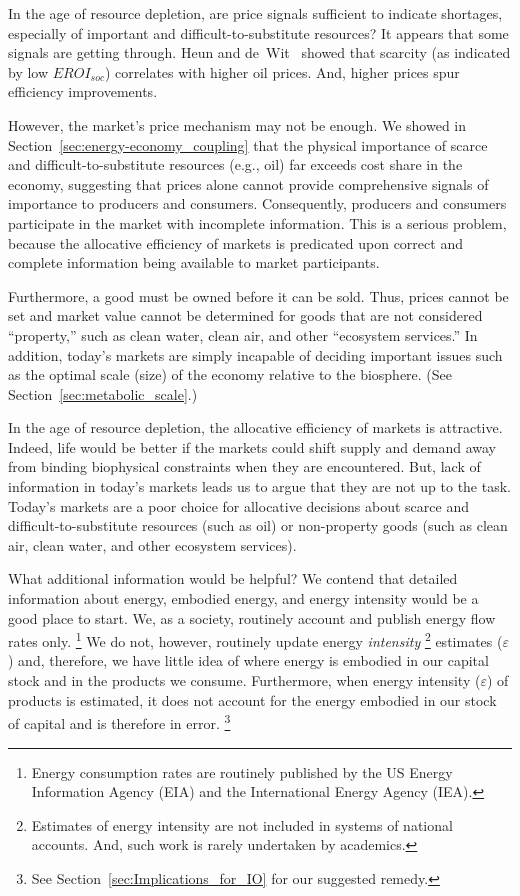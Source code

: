 In the age of resource depletion, 
are price signals sufficient to indicate shortages, 
especially of important and difficult-to-substitute resources?
It appears that some signals are getting through.
Heun and de~Wit~\cite{Heun:2012ek}
showed that scarcity (as indicated by low $EROI_{soc}$)
correlates with higher oil prices.
And, higher prices spur efficiency improvements.\cite{Vlasic:2013aa}

However, the market's price mechanism may not be enough.
We showed in Section~\ref{sec:energy-economy_coupling}
that the physical importance 
of scarce and difficult-to-substitute resources (e.g., oil) 
far exceeds cost share in the economy,
suggesting that prices alone cannot provide comprehensive
signals of importance to producers and consumers.
Consequently, producers and consumers participate 
in the market with incomplete information.
This is a serious problem, 
because the allocative efficiency of markets 
is predicated upon
correct and complete information being available to market participants.

Furthermore, a good must be owned before 
it can be sold.
Thus, prices cannot be set and market value cannot be determined
for goods that are not considered ``property,'' 
such as clean water, clean air, and other ``ecosystem services.''
In addition, today's markets are simply incapable of deciding
important issues such as the optimal scale (size) of the economy
relative to the biosphere. (See Section~\ref{sec:metabolic_scale}.)

In the age of resource depletion, the allocative efficiency of markets is attractive.
Indeed, life would be better if the markets could shift supply and demand away from
binding biophysical constraints when they are encountered. 
But, lack of information
in today's markets leads us to argue that they are not up to the task. 
Today's markets are a poor choice for allocative decisions 
about scarce and difficult-to-substitute resources (such as oil)
or non-property goods (such as clean air, clean water, and other ecosystem services).

What additional information would be helpful?
We contend that detailed information about energy, embodied energy, and energy intensity
would be a good place to start.
We, as a society, routinely account and publish energy flow rates only.%
	 \footnote{
	 Energy consumption rates are routinely published by the 
	 US Energy Information Agency (EIA) and the 
	 International Energy Agency (IEA).
	 }
We do not, however, routinely update energy \emph{intensity}%
	\footnote{
	Estimates of energy intensity are not included in systems of national accounts.
	And, such work is rarely undertaken by academics.\citep{Bullard1975, EIOLCA2014} 
	}
estimates ($\varepsilon$)
and, therefore, 
we have little idea of where energy is embodied 
in our capital stock and 
in the products we consume.
Furthermore, when energy intensity ($\varepsilon$) of products is estimated, 
it does not account for the energy embodied in our stock of capital
and is therefore in error.%
	\footnote{
	See Section~\ref{sec:Implications_for_IO} for our suggested remedy.
	}
	
